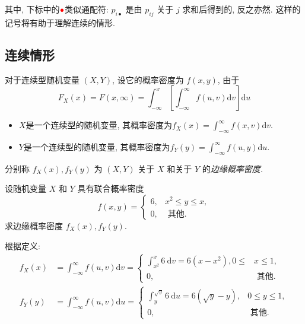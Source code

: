     其中, 下标中的${{\color{red}\bullet}}$类似通配符: $p_{i\bullet}$ 是由 $p_{i j}$ 关于 $j$ 求和后得到的, 反之亦然. 这样的记号将有助于理解连续的情形.

    \subsection{连续情形}

    \begin{definition*}
      对于连续型随机变量 $(X, Y)$, 设它的概率密度为 $f(x, y)$, 由于
        $$
            F_X(x)=F(x, \infty)=\int_{-\infty}^x\left[\int_{-\infty}^{\infty} f(u, v) \mathrm{d} v\right] \mathrm{d} u
        $$

        \begin{itemize}
            \item $X$是一个连续型的随机变量, 其概率密度为$f_X(x)=\int_{-\infty}^{\infty} f(x, v) \mathrm{d} v$.
            \item $Y$是一个连续型的随机变量, 其概率密度为$f_Y(y)=\int_{-\infty}^{\infty} f(u, y) \mathrm{d} u$.
        \end{itemize}

        分别称 $f_X(x), f_Y(y)$ 为 $(X, Y)$ 关于 $X$ 和关于 $Y$ 的\emph{边缘概率密度.}
    \end{definition*}

    \begin{example}
      设随机变量 $X$ 和 $Y$ 具有联合概率密度
            $$
                f(x, y)= \begin{cases}6, & x^2 \leqslant y \leqslant x, \\ 0, & \text { 其他. }\end{cases}
            $$
            求边缘概率密度 $f_X(x), f_Y(y)$.
    \end{example}

    \begin{solution}根据定义:
      $$\begin{aligned}
              f_X(x) & =\int_{-\infty}^{\infty} f(u, v) \mathrm{d} v= \begin{cases}\int_{x^2}^x 6 \mathrm{~d} v=6\left(x-x^2\right), 0 \leqslant & x \leqslant 1, \\
           0,                                                            & \text { 其他. }\end{cases}               \\
              f_Y(y) & =\int_{-\infty}^{\infty} f(u, v) \mathrm{d} u = \begin{cases}\int_y^{\sqrt{y}} 6 \mathrm{~d} u=6(\sqrt{y}-y), & 0 \leqslant y \leqslant 1, \\
           0,                                               & \text { 其他. }\end{cases}
          \end{aligned}
      $$
  \end{solution}

